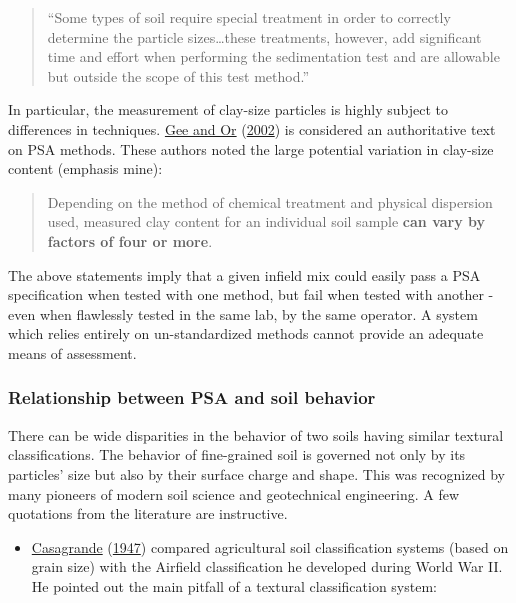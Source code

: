 \documentclass[
  letterpaper,
  openany]{book}
\providecommand{\tightlist}{%
  \setlength{\itemsep}{0pt}\setlength{\parskip}{0pt}}
\renewenvironment{leftbar}{\def\FrameCommand{\color{grey30}\vrule width 1pt \hspace{10pt}}\MakeFramed {\advance\hsize-\width \FrameRestore}}{\endMakeFramed}
\renewenvironment{quote}%
{\begin{leftbar} \begin{quotation} \noindent \small }%
{\end{quotation}\end{leftbar}}
\begin{document}
\begin{quote}
``Some types of soil require special treatment in order to correctly determine the particle sizes\ldots these treatments, however, add significant time and effort when performing the sedimentation test and are allowable but outside the scope of this test method.''
\end{quote}

In particular, the measurement of clay-size particles is highly subject to differences in techniques.
\protect\hyperlink{ref-Gee2002}{Gee and Or} (\protect\hyperlink{ref-Gee2002}{2002}) is considered an authoritative text on PSA methods. These authors noted the large potential variation in clay-size content (emphasis mine):

\begin{quote}
Depending on the method of chemical treatment and physical dispersion used, measured clay content for an individual soil sample \textbf{can vary by factors of four or more}.
\end{quote}

The above statements imply that a given infield mix could easily pass a PSA specification when tested with one method, but fail when tested with another - even when flawlessly tested in the same lab, by the same operator.
A system which relies entirely on un-standardized methods cannot provide an adequate means of assessment.

\hypertarget{relationship-between-psa-and-soil-behavior}{%
\subsubsection{Relationship between PSA and soil behavior}\label{relationship-between-psa-and-soil-behavior}}

There can be wide disparities in the behavior of two soils having similar textural classifications.
The behavior of fine-grained soil is governed not only by its particles' size but also by their surface charge and shape.
This was recognized by many pioneers of modern soil science and geotechnical engineering.
A few quotations from the literature are instructive.

\begin{itemize}
\tightlist
\item
  \protect\hyperlink{ref-Casagrande1947}{Casagrande} (\protect\hyperlink{ref-Casagrande1947}{1947}) compared agricultural soil classification systems (based on grain size) with the Airfield classification he developed during World War II. He pointed out the main pitfall of a textural classification system:
\end{itemize}
\end{document}
